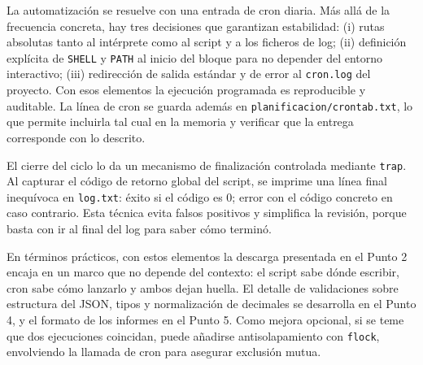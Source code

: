 La automatización se resuelve con una entrada de cron diaria. Más allá de la frecuencia concreta, hay tres decisiones que garantizan estabilidad: (i) rutas absolutas tanto al intérprete como al script y a los ficheros de log; (ii) definición explícita de \texttt{SHELL} y \texttt{PATH} al inicio del bloque para no depender del entorno interactivo; (iii) redirección de salida estándar y de error al \texttt{cron.log} del proyecto. Con esos elementos la ejecución programada es reproducible y auditable. La línea de cron se guarda además en \texttt{planificacion/crontab.txt}, lo que permite incluirla tal cual en la memoria y verificar que la entrega corresponde con lo descrito.

El cierre del ciclo lo da un mecanismo de finalización controlada mediante \texttt{trap}. Al capturar el código de retorno global del script, se imprime una línea final inequívoca en \texttt{log.txt}: éxito si el código es 0; error con el código concreto en caso contrario. Esta técnica evita falsos positivos y simplifica la revisión, porque basta con ir al final del log para saber cómo terminó.

En términos prácticos, con estos elementos la descarga presentada en el Punto 2 encaja en un marco que no depende del contexto: el script sabe dónde escribir, cron sabe cómo lanzarlo y ambos dejan huella. El detalle de validaciones sobre estructura del JSON, tipos y normalización de decimales se desarrolla en el Punto 4, y el formato de los informes en el Punto 5. Como mejora opcional, si se teme que dos ejecuciones coincidan, puede añadirse antisolapamiento con \texttt{flock}, envolviendo la llamada de cron para asegurar exclusión mutua.

